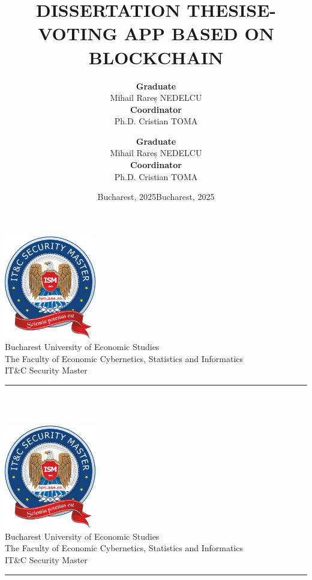 \documentclass[a4paper,10pt]{report}
\title{\textbf{DISSERTATION THESIS}}
\author{
\textbf{Graduate} \\ Mihail Rareș NEDELCU \\[0.5cm]
\textbf{Coordinator} \\ Ph.D. Cristian TOMA
}
\date{Bucharest, 2025}
\begin{document}
\begin{titlepage}
\centering

\includegraphics[width=0.3\textwidth]{Logo-ISM_medium.png}\\[0.3cm]

{\large Bucharest University of Economic Studies}\\[0.3cm]
{\large The Faculty of Economic Cybernetics, Statistics and Informatics}\\[0.3cm]
{\large IT\&C Security Master}\\[3cm]

{\Huge\thetitle}
\noindent\rule{\linewidth}{0.4pt} \\[3cm]
{\large\theauthor}\\[2cm]

{\large\thedate}
\end{titlepage}

\title{\textbf{E-VOTING APP BASED ON BLOCKCHAIN} \\[1cm] }
\author{
\textbf{Graduate} \\ Mihail Rareș NEDELCU \\[0.5cm]
\textbf{Coordinator} \\ Ph.D. Cristian TOMA
}
\date{Bucharest, 2025}


\begin{titlepage}
\centering

\includegraphics[width=0.3\textwidth]{Logo-ISM_medium.png}\\[0.3cm]

{\large Bucharest University of Economic Studies}\\[0.3cm]
{\large The Faculty of Economic Cybernetics, Statistics and Informatics}\\[0.3cm]
{\large IT\&C Security Master}\\[3cm]

{\Huge\thetitle}
\noindent\rule{\linewidth}{0.4pt} \\[3cm]
{\large\theauthor}\\[2cm]

{\large\thedate}
\end{titlepage}
\end{document}
